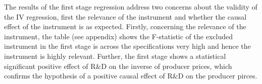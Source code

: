 \par   The results of the first stage regression address two concerns about the validity of the IV regression, first the relevance of the instrument and whether the causal effect of the instrument is as expected.
Firstly, concerning the relevance of the instrument, the table (see appendix) shows the F-statistic of the excluded instrument in the first stage is across the specifications very high and hence the instrument is highly relevant.
Further, the first stage shows a statistical significant positive effect of  R\&D on the inverse of producer prices, which confirms the hypothesis of a positive causal effect of R\&D on the producer pirces.  %
